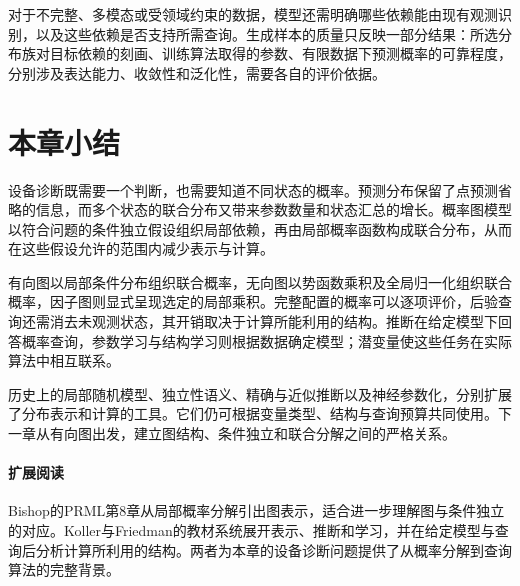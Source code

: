 对于不完整、多模态或受领域约束的数据，模型还需明确哪些依赖能由现有观测识别，以及这些依赖是否支持所需查询。生成样本的质量只反映一部分结果：所选分布族对目标依赖的刻画、训练算法取得的参数、有限数据下预测概率的可靠程度，分别涉及表达能力、收敛性和泛化性，需要各自的评价依据。

\section{本章小结}
\label{sec:pgm-overview-summary}

设备诊断既需要一个判断，也需要知道不同状态的概率。预测分布保留了点预测省略的信息，而多个状态的联合分布又带来参数数量和状态汇总的增长。概率图模型以符合问题的条件独立假设组织局部依赖，再由局部概率函数构成联合分布，从而在这些假设允许的范围内减少表示与计算。

有向图以局部条件分布组织联合概率，无向图以势函数乘积及全局归一化组织联合概率，因子图则显式呈现选定的局部乘积。完整配置的概率可以逐项评价，后验查询还需消去未观测状态，其开销取决于计算所能利用的结构。推断在给定模型下回答概率查询，参数学习与结构学习则根据数据确定模型；潜变量使这些任务在实际算法中相互联系。

历史上的局部随机模型、独立性语义、精确与近似推断以及神经参数化，分别扩展了分布表示和计算的工具。它们仍可根据变量类型、结构与查询预算共同使用。下一章从有向图出发，建立图结构、条件独立和联合分解之间的严格关系。

\paragraph{扩展阅读}
Bishop的PRML第8章从局部概率分解引出图表示，适合进一步理解图与条件独立的对应。Koller与Friedman的教材系统展开表示、推断和学习，并在给定模型与查询后分析计算所利用的结构。两者为本章的设备诊断问题提供了从概率分解到查询算法的完整背景。
